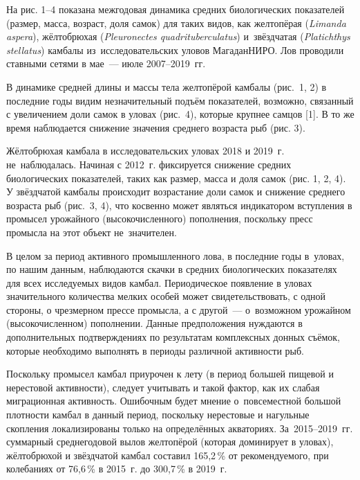 На рис. 1--4 показана межгодовая динамика средних биологических показателей (размер, масса, возраст, доля самок) для таких видов, как желтопёрая (\textit{Limanda aspera}), жёлтобрюхая (\textit{Pleuronectes quadrituberculatus}) и~звёздчатая (\textit{Platichthys stellatus}) камбалы из~исследовательских уловов МагаданНИРО. Лов проводили ставными сетями в мае~--- июле 2007--2019~гг.
\clearpage





В динамике средней длины и массы тела желтопёрой камбалы (рис.~1, 2) в последние годы видим незначительный подъём показателей, возможно, связанный с увеличением доли самок в уловах (рис. 4), которые крупнее самцов [1]. В то же время наблюдается снижение значения среднего возраста рыб (рис. 3).

Жёлтобрюхая камбала в исследовательских уловах 2018 и 2019~г. не~наблюдалась. Начиная с 2012~г. фиксируется снижение средних биологических показателей, таких как размер, масса и доля самок (рис. 1, 2, 4).
\clearpage
У звёздчатой камбалы происходит возрастание доли самок и снижение среднего возраста рыб (рис. 3, 4), что косвенно может являться индикатором вступления в промысел урожайного (высокочисленного) пополнения, поскольку пресс промысла на этот объект не~значителен.

В целом за период активного промышленного лова, в последние годы в~уловах, по нашим данным, наблюдаются скачки в средних биологических показателях для всех исследуемых видов камбал. Периодическое появление в уловах значительного количества мелких особей может свидетельствовать, с одной стороны, о чрезмерном прессе промысла, а с другой~--- о~возможном урожайном (высокочисленном) пополнении. Данные предположения нуждаются в дополнительных подтверждениях по результатам комплексных донных съёмок, которые необходимо выполнять в периоды различной активности рыб.

Поскольку промысел камбал приурочен к лету (в период большей пищевой и нерестовой активности), следует учитывать и такой фактор, как их слабая миграционная активность. Ошибочным будет мнение о~повсеместной большой плотности камбал в данный период, поскольку нерестовые и нагульные скопления локализированы только на определённых акваториях. За~2015--2019~гг. суммарный среднегодовой вылов желтопёрой (которая доминирует в уловах), жёлтобрюхой и звёздчатой камбал составил 165,2\,\% от рекомендуемого, при колебаниях от 76,6\,\% в 2015~г. до 300,7\,\% в 2019~г.


